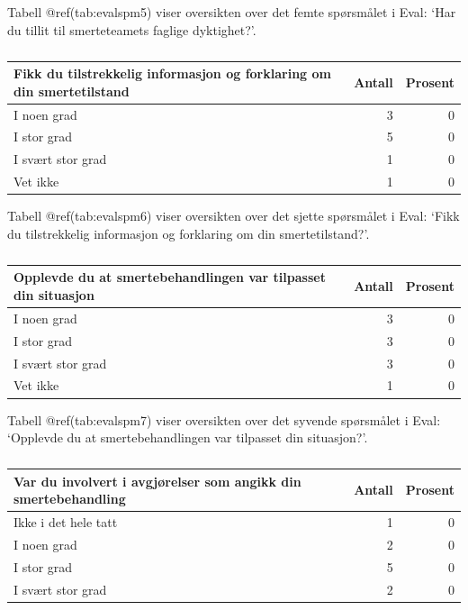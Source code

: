 \documentclass[
]{article}
\begin{document}
Tabell @ref(tab:evalspm5) viser oversikten over det femte spørsmålet i
Eval: `Har du tillit til smerteteamets faglige dyktighet?'.

\begin{table}

\caption{\label{tab:evalspm6}}
\centering
\begin{tabular}[t]{l|r|r}
\hline
Fikk du tilstrekkelig informasjon og forklaring om din smertetilstand & Antall  & Prosent\\
\hline
I noen grad & 3 & 0\\
\hline
I stor grad & 5 & 0\\
\hline
I svært stor grad & 1 & 0\\
\hline
Vet ikke & 1 & 0\\
\hline
\end{tabular}
\end{table}

Tabell @ref(tab:evalspm6) viser oversikten over det sjette spørsmålet i
Eval: `Fikk du tilstrekkelig informasjon og forklaring om din
smertetilstand?'.

\begin{table}

\caption{\label{tab:evalspm7}}
\centering
\begin{tabular}[t]{l|r|r}
\hline
Opplevde du at smertebehandlingen var tilpasset din situasjon & Antall  & Prosent\\
\hline
I noen grad & 3 & 0\\
\hline
I stor grad & 3 & 0\\
\hline
I svært stor grad & 3 & 0\\
\hline
Vet ikke & 1 & 0\\
\hline
\end{tabular}
\end{table}

Tabell @ref(tab:evalspm7) viser oversikten over det syvende spørsmålet i
Eval: `Opplevde du at smertebehandlingen var tilpasset din situasjon?'.

\begin{table}

\caption{\label{tab:evalspm8}}
\centering
\begin{tabular}[t]{l|r|r}
\hline
Var du involvert i avgjørelser som angikk din smertebehandling & Antall  & Prosent\\
\hline
Ikke i det hele tatt & 1 & 0\\
\hline
I noen grad & 2 & 0\\
\hline
I stor grad & 5 & 0\\
\hline
I svært stor grad & 2 & 0\\
\hline
\end{tabular}
\end{table}
\end{document}

